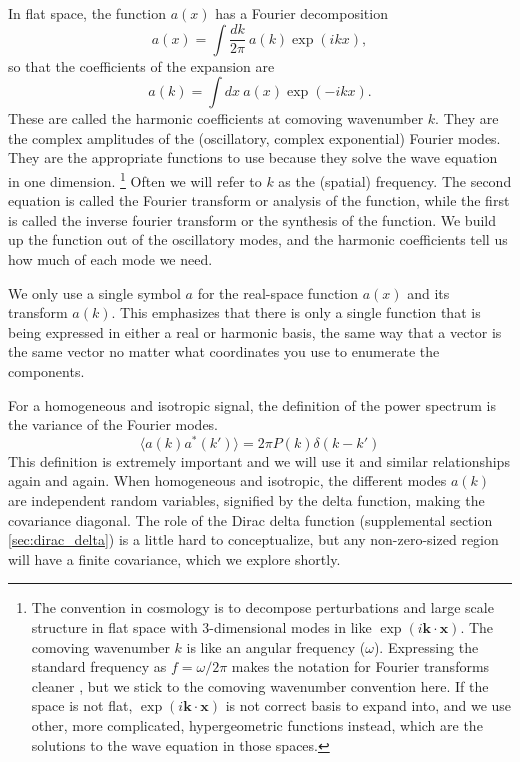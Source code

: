 In flat space, the function $a(x)$ has a Fourier decomposition
\begin{equation}
  a(x) = \int \frac{dk}{2\pi}\ a(k) \exp(i kx),
\end{equation}
so that the coefficients of the expansion are 
\begin{equation}
  a(k) = \int dx\ a(x) \exp(-i kx).
\end{equation}
These are called the harmonic coefficients at comoving wavenumber $k$.  They are the complex amplitudes of the (oscillatory, complex exponential) Fourier modes.  They are the appropriate functions to use because they solve the wave equation in one dimension.%
%
\footnote{The convention in cosmology is to decompose perturbations and large scale structure in flat space with 3-dimensional modes in like $\exp(i \mathbf{k} \cdot \mathbf{x})$.  The comoving wavenumber $k$ is like an angular frequency ($\omega$).  Expressing the standard frequency as $f = \omega/2\pi$ makes the notation for Fourier transforms cleaner \citep{1992nrca.book.....P}, but we stick to the comoving wavenumber convention here.  If the space is not flat, $\exp(i \mathbf{k}\cdot \mathbf{x})$ is not correct basis to expand into, and we use other, more complicated, hypergeometric functions instead, which are the solutions to the wave equation in those spaces.}  Often we will refer to $k$ as the (spatial) frequency.
The second equation is called the Fourier transform or analysis of the function, while the first is called the inverse fourier transform or the synthesis of the function.  We build up the function out of the oscillatory modes, and the harmonic coefficients tell us how much of each mode we need.  

We only use a single symbol $a$ for the real-space function $a(x)$ and its transform $a(k)$.  This emphasizes that there is only a single function that is being expressed in either a real or harmonic basis, the same way that a vector is the same vector no matter what coordinates you use to enumerate the components.

 For a homogeneous and isotropic signal, the definition of the power spectrum is the variance of the Fourier modes.
\begin{equation}
  \langle a(k) a^*(k') \rangle = 2\pi P(k) \delta(k - k') 
\end{equation}
This definition is extremely important and we will use it and similar relationships again and again.   When homogeneous and isotropic, the different modes $a(k)$ are independent random variables, signified by the delta function, making the covariance diagonal.  The role of the Dirac delta function (supplemental section \ref{sec:dirac_delta}) is a little hard to conceptualize, but any non-zero-sized region will have a finite covariance, which we explore shortly.

